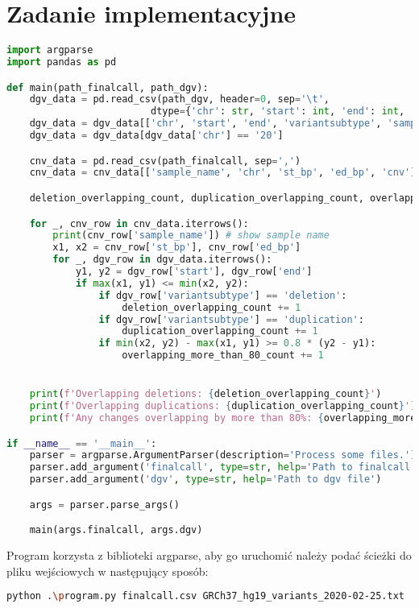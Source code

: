 \documentclass{article}
\begin{document}
\section{Zadanie implementacyjne}
\begin{lstlisting}[language=Python]
import argparse
import pandas as pd

def main(path_finalcall, path_dgv):
    dgv_data = pd.read_csv(path_dgv, header=0, sep='\t',
                         dtype={'chr': str, 'start': int, 'end': int, 'variantsubtype': str, 'samples': str})
    dgv_data = dgv_data[['chr', 'start', 'end', 'variantsubtype', 'samples']]
    dgv_data = dgv_data[dgv_data['chr'] == '20']

    cnv_data = pd.read_csv(path_finalcall, sep=',')
    cnv_data = cnv_data[['sample_name', 'chr', 'st_bp', 'ed_bp', 'cnv']]

    deletion_overlapping_count, duplication_overlapping_count, overlapping_more_than_80_count = 0, 0, 0

    for _, cnv_row in cnv_data.iterrows():
        print(cnv_row['sample_name']) # show sample name
        x1, x2 = cnv_row['st_bp'], cnv_row['ed_bp']
        for _, dgv_row in dgv_data.iterrows():
            y1, y2 = dgv_row['start'], dgv_row['end']
            if max(x1, y1) <= min(x2, y2):
                if dgv_row['variantsubtype'] == 'deletion':
                    deletion_overlapping_count += 1
                if dgv_row['variantsubtype'] == 'duplication':
                    duplication_overlapping_count += 1
                if min(x2, y2) - max(x1, y1) >= 0.8 * (y2 - y1):
                    overlapping_more_than_80_count += 1


    print(f'Overlapping deletions: {deletion_overlapping_count}')
    print(f'Overlapping duplications: {duplication_overlapping_count}')
    print(f'Any changes overlapping by more than 80%: {overlapping_more_than_80_count}')

if __name__ == '__main__':
    parser = argparse.ArgumentParser(description='Process some files.')
    parser.add_argument('finalcall', type=str, help='Path to finalcall file')
    parser.add_argument('dgv', type=str, help='Path to dgv file')

    args = parser.parse_args()

    main(args.finalcall, args.dgv)

\end{lstlisting}

Program korzysta z biblioteki argparse, aby go uruchomić należy podać ścieżki do pliku wejściowych w następujący sposób:
\begin{lstlisting}[language=bash]
python .\program.py finalcall.csv GRCh37_hg19_variants_2020-02-25.txt
\end{lstlisting}
\end{document}
